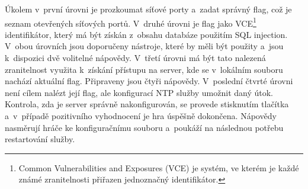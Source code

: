 \documentclass[
  digital, %
  oneside, %
  table,   %
  nolof,     %
  nolot,     %
]{fithesis3}
\begin{document}
Úkolem v~první úrovni je prozkoumat síťové porty a~zadat správný flag, což je seznam otevřených síťových portů. V~druhé úrovni je flag jako VCE\footnote{Common Vulnerabilities and Exposures (VCE) je systém, ve kterém je každé známé zranitelnosti přiřazen jednoznačný identifikátor.} identifikátor, který má být získán z~obsahu databáze použitím SQL injection. V~obou úrovních jsou doporučeny nástroje, které by měli být použity a~jsou k~dispozici dvě volitelné nápovědy. V~třetí úrovni má být tato nalezená zranitelnost využita k~získání přístupu na server, kde se v~lokálním souboru nachází aktuální flag. Připraveny jsou čtyři nápovědy. V~poslední čtvrté úrovni není cílem nalézt její flag, ale konfigurací NTP služby umožnit daný útok. Kontrola, zda je server správně nakonfigurován, se provede stisknutím tlačítka a~v~případě pozitivního vyhodnocení je hra úspěšně dokončena. Nápovědy nasměrují hráče ke konfiguračnímu souboru a~poukáží na následnou potřebu restartování služby.
\end{document}
